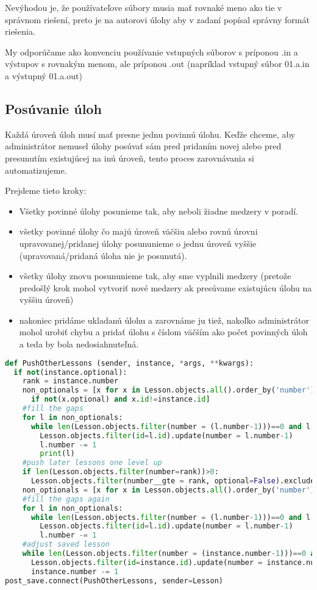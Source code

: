 Nevýhodou je, že používateľove súbory musia mať rovnaké meno ako tie v správnom riešení,
preto je na autorovi úlohy aby v zadaní popísal správny formát riešenia.

My odporúčame ako konvenciu používanie vstupných súborov s príponou .in a výstupov
s rovnakým menom, ale príponou .out (napríklad vstupný súbor 01.a.in a výstupný 01.a.out)

\subsection{Posúvanie úloh}
\label{implementacia:posuvanie}
Každá úroveň úloh musí mať presne jednu povinnú úlohu. Keďže chceme, aby administrátor
nemusel úlohy posúvať sám pred pridaním novej alebo pred presunutím existujúcej na inú úroveň,
tento proces zarovnávania si automatizujeme.

Prejdeme tieto kroky:
\begin{itemize}
\item Všetky povinné úlohy posunieme tak, aby neboli žiadne medzery v poradí.
\item všetky povinné úlohy čo majú úroveň väčšiu alebo rovnú úrovni upravovanej/pridanej
 úlohy posununieme o jednu úroveň vyššie (upravovaná/pridaná úloha nie je posunutá).
\item všetky úlohy znovu posununieme tak, aby sme vyplnili medzery (pretože predošlý krok mohol
    vytvoriť nové medzery ak presúvame existujúcu úlohu na vyššiu úroveň)
\item nakoniec pridáme ukladanú úlohu a zarovnáme ju tiež, nakoľko administrátor mohol urobiť chybu a pridať úlohu
    s číslom väčším ako počet povinných úloh a teda by bola nedosiahnuteľná.
\end{itemize}

\begin{lstlisting}[language=Python, title = Posúvanie úloh]
def PushOtherLessons (sender, instance, *args, **kwargs):
  if not(instance.optional):
    rank = instance.number
    non_optionals = [x for x in Lesson.objects.all().order_by('number')
      if not(x.optional) and x.id!=instance.id]
    #fill the gaps
    for l in non_optionals:
      while len(Lesson.objects.filter(number = (l.number-1)))==0 and l.number>1:
        Lesson.objects.filter(id=l.id).update(number = l.number-1)
        l.number -= 1
        print(l)
    #push later lessons one level up
    if len(Lesson.objects.filter(number=rank))>0:
      Lesson.objects.filter(number__gte = rank, optional=False).exclude(id=instance.id).update(number = F('number')+1)
    non_optionals = [x for x in Lesson.objects.all().order_by('number') if not(x.optional) and x.id!=instance.id]
    #fill the gaps again
    for l in non_optionals:
      while len(Lesson.objects.filter(number = (l.number-1)))==0 and l.number>1:
        Lesson.objects.filter(id=l.id).update(number = l.number-1)
        l.number -= 1
    #adjust saved lesson
    while len(Lesson.objects.filter(number = (instance.number-1)))==0 and instance.number>1:
      Lesson.objects.filter(id=instance.id).update(number = instance.number-1)
      instance.number -= 1
post_save.connect(PushOtherLessons, sender=Lesson)
\end{lstlisting}

